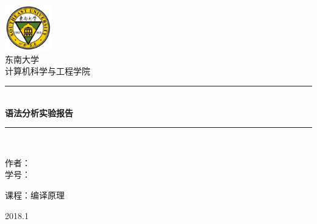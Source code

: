 \begin{titlepage}
\begin{center}

\includegraphics[width=0.15\textwidth]{../assets/logo.jpg}\\[1cm]

\textsc{\LARGE 东南大学} \\[1.5cm]
\textsc{\Large 计算机科学与工程学院} \\[0.5cm]

{\rule{\linewidth}{1mm}}\\[0.4cm]
{\huge \bfseries 语法分析实验报告} \\[0.4cm]
{\rule{\linewidth}{0.5mm}}\\[1.5cm]

\begin{minipage}{0.4\textwidth}
\begin{flushleft}
\large
作者：\\
学号：
\end{flushleft}
\end{minipage}
\begin{minipage}{0.4\textwidth}
\end{minipage}
\begin{minipage}{0.4\textwidth}
\begin{flushright}
\large
课程：编译原理
\end{flushright}
\end{minipage}

\vfill

{\large 2018.1}

\end{center}
\end{titlepage}
